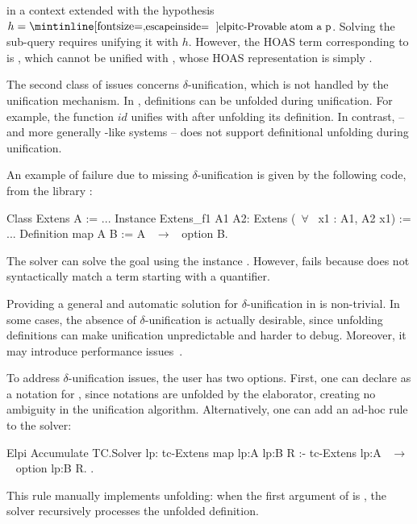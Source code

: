 \noindent in a context extended with the
hypothesis $h = \eI{tc-Provable {{atom a}} p}$. Solving the sub-query
requires unifying it with $h$. However, the HOAS term corresponding to
 is , which cannot be unified with ,
whose HOAS representation is simply .

The second class of issues concerns $\delta$-unification, which is not
handled by the \elpi unification mechanism. In \rocq, definitions can be
unfolded during unification. For example, the function $id$ unifies with
 after unfolding its definition. In contrast, \elpi{} -- and
more generally \prolog-like systems -- does not support definitional
unfolding during unification.

An example of failure due to missing $\delta$-unification is given by the
following code, from the library \tlc:

\begin{coqcode}
  Class Extens A := ...
  Instance Extens_f1 A1 A2: Extens (~$\forall$~ x1 : A1, A2 x1) := ...
  Definition map A B := A ~$\to$~ option B.
\end{coqcode}

The \rocq solver can solve the goal  using the
instance . However, \elpi fails because  does not
syntactically match a term starting with a quantifier.

Providing a general and automatic solution for $\delta$-unification in
\elpi is non-trivial. In some cases, the absence of $\delta$-unification is
actually desirable, since unfolding definitions can make unification
unpredictable and harder to debug. Moreover, it may introduce performance
issues~\cite{rocq-unif}.

To address $\delta$-unification issues, the user has two options. First,
one can declare  as a notation for , since
notations are unfolded by the elaborator, creating no ambiguity in the
unification algorithm. Alternatively, one can add an
ad-hoc rule to the solver:

\newpage

\begin{coqcode}
  Elpi Accumulate TC.Solver lp:{{
    tc-Extens {{map lp:A lp:B}} R :-
      tc-Extens {{lp:A ~$\to$~ option lp:B}} R.
  }}.
\end{coqcode}

This rule manually implements unfolding: when the first argument of
 is , the solver recursively processes the unfolded
definition.

